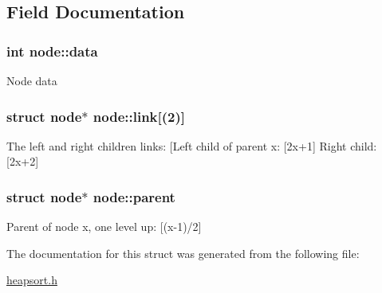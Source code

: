 \subsection{Field Documentation}
\hypertarget{structnode_a2d890bb9f6af0ffd73fe79b21124c2a2}{
\subsubsection[{data}]{\setlength{\rightskip}{0pt plus 5cm}int {\bf node\-::data}}}\label{structnode_a2d890bb9f6af0ffd73fe79b21124c2a2}
Node data \hypertarget{structnode_a264c6bb358b6e82049b98821d0f8f3ce}{
\subsubsection[{link}]{\setlength{\rightskip}{0pt plus 5cm}struct {\bf node}$\ast$ {\bf node\-::link}\mbox{[}(2)\mbox{]}}}\label{structnode_a264c6bb358b6e82049b98821d0f8f3ce}
The left and right children links\-: \mbox{[}Left child of parent x\-: \mbox{[}2x+1\mbox{]} Right child\-: \mbox{[}2x+2\mbox{]} \hypertarget{structnode_a05e4fe9e0177ba2d8dbd2c487cfddd53}{
\subsubsection[{parent}]{\setlength{\rightskip}{0pt plus 5cm}struct {\bf node}$\ast$ {\bf node\-::parent}}}\label{structnode_a05e4fe9e0177ba2d8dbd2c487cfddd53}
Parent of node x, one level up\-: \mbox{[}(x-\/1)/2\mbox{]} 

The documentation for this struct was generated from the following file\-:\begin{DoxyCompactItemize}
\item 
\hyperlink{heapsort_8h}{heapsort.\-h}\end{DoxyCompactItemize}
